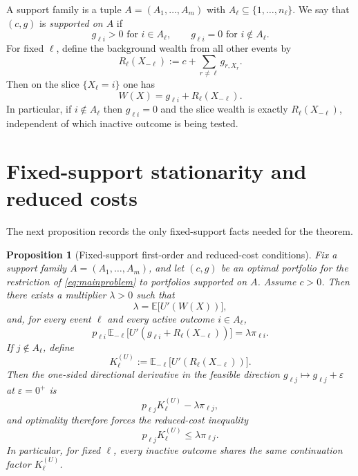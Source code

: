 \documentclass[11pt]{article}
\newtheorem{proposition}[theorem]{Proposition}
\newcommand{\E}{\mathbb{E}}
\begin{document}
A support family is a tuple $A=(A_1,\dots,A_m)$ with $A_\ell\subseteq\{1,\dots,n_\ell\}$. We say that $(c,g)$ is \emph{supported on $A$} if
\[
  g_{\ell i}>0 \text{ for } i\in A_\ell,
  \qquad
  g_{\ell i}=0 \text{ for } i\notin A_\ell.
\]
For fixed $\ell$, define the background wealth from all other events by
\begin{equation}\label{eq:Rell}
  R_\ell(X_{-\ell}) := c+\sum_{r\ne \ell} g_{r,X_r}.
\end{equation}
Then on the slice $\{X_\ell=i\}$ one has
\[
  W(X)=g_{\ell i}+R_\ell(X_{-\ell}).
\]
In particular, if $i\notin A_\ell$ then $g_{\ell i}=0$ and the slice wealth is exactly $R_\ell(X_{-\ell})$, independent of which inactive outcome is being tested.

\section{Fixed-support stationarity and reduced costs}
The next proposition records the only fixed-support facts needed for the theorem.

\begin{proposition}[Fixed-support first-order and reduced-cost conditions]\label{prop:kkt}
Fix a support family $A=(A_1,\dots,A_m)$, and let $(c,g)$ be an optimal portfolio for the restriction of \eqref{eq:mainproblem} to portfolios supported on $A$. Assume $c>0$. Then there exists a multiplier $\lambda>0$ such that
\begin{equation}\label{eq:cashstationarity}
  \lambda = \E\bigl[U'(W(X))\bigr],
\end{equation}
and, for every event $\ell$ and every active outcome $i\in A_\ell$,
\begin{equation}\label{eq:activestationarity}
  p_{\ell i}\,\E_{-\ell}\bigl[U'(g_{\ell i}+R_\ell(X_{-\ell}))\bigr]=\lambda\pi_{\ell i}.
\end{equation}
If $j\notin A_\ell$, define
\begin{equation}\label{eq:Kell}
  K_\ell^{(U)}:=\E_{-\ell}\bigl[U'(R_\ell(X_{-\ell}))\bigr].
\end{equation}
Then the one-sided directional derivative in the feasible direction $g_{\ell j}\mapsto g_{\ell j}+\varepsilon$ at $\varepsilon=0^+$ is
\[
  p_{\ell j}K_\ell^{(U)}-\lambda\pi_{\ell j},
\]
and optimality therefore forces the reduced-cost inequality
\begin{equation}\label{eq:reducedcost}
  p_{\ell j}K_\ell^{(U)}\le \lambda\pi_{\ell j}.
\end{equation}
In particular, for fixed $\ell$, every inactive outcome shares the same continuation factor $K_\ell^{(U)}$.
\end{proposition}
\end{document}
